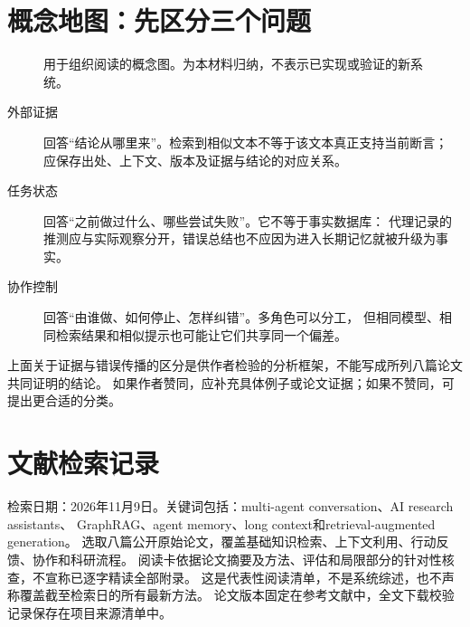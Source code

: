 \documentclass[UTF8,fontset=fandol,12pt,a4paper]{ctexart}
\begin{document}
\section{概念地图：先区分三个问题}
\begin{figure}[htbp]\centering
{}
\caption{用于组织阅读的概念图。为本材料归纳，不表示已实现或验证的新系统。}
\end{figure}

\begin{description}
\item[外部证据] 回答“结论从哪里来”。检索到相似文本不等于该文本真正支持当前断言；
应保存出处、上下文、版本及证据与结论的对应关系。
\item[任务状态] 回答“之前做过什么、哪些尝试失败”。它不等于事实数据库：
代理记录的推测应与实际观察分开，错误总结也不应因为进入长期记忆就被升级为事实。
\item[协作控制] 回答“由谁做、如何停止、怎样纠错”。多角色可以分工，
但相同模型、相同检索结果和相似提示也可能让它们共享同一个偏差。
\end{description}

上面关于证据与错误传播的区分是供作者检验的分析框架，不能写成所列八篇论文共同证明的结论。
如果作者赞同，应补充具体例子或论文证据；如果不赞同，可提出更合适的分类。

\section{文献检索记录}
检索日期：2026年11月9日。关键词包括：multi-agent conversation、AI research assistants、
GraphRAG、agent memory、long context和retrieval-augmented generation。
选取八篇公开原始论文，覆盖基础知识检索、上下文利用、行动反馈、协作和科研流程。
阅读卡依据论文摘要及方法、评估和局限部分的针对性核查，不宣称已逐字精读全部附录。
这是代表性阅读清单，不是系统综述，也不声称覆盖截至检索日的所有最新方法。
论文版本固定在参考文献中，全文下载校验记录保存在项目来源清单中。
\end{document}
